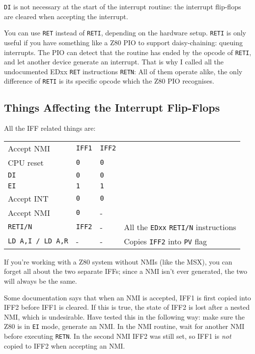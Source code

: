 {\tt DI} is not necessary at the start of the interrupt routine: the interrupt flip-flops are cleared when accepting the interrupt.

You can use {\tt RET} instead of {\tt RETI}, depending on the hardware setup. {\tt RETI} is only useful if you have something like a Z80 PIO to support daisy-chaining: queuing interrupts. The PIO can detect that the routine has ended by the opcode of {\tt RETI}, and let another device generate an interrupt. That is why I called all the undocumented EDxx {\tt RET} instructions {\tt RETN}: All of them operate alike, the only difference of {\tt RETI} is its specific opcode which the Z80 PIO recognises.


\subsection{Things Affecting the Interrupt Flip-Flops}
\label{flipflop}

All the IFF related things are:

\begin{tabular}{llll}
    Accept NMI	& {\tt IFF1}	& {\tt IFF2} \\
    CPU reset	& {\tt 0}		& {\tt 0}\\
    {\tt DI}	& {\tt 0}		& {\tt 0}\\
    {\tt EI}	& {\tt 1}		& {\tt 1}\\
    Accept INT	& {\tt 0}		& {\tt 0}\\
    Accept NMI	& {\tt 0}		& -\\
    {\tt RETI/N}& {\tt IFF2}	& - & All the {\tt EDxx} {\tt RETI/N} instructions\\
    {\tt LD A,I / LD A,R} & - & - & Copies {\tt IFF2} into {\tt PV} flag
\end{tabular}

If you're working with a Z80 system without NMIs (like the MSX), you can forget all about the two separate IFFs; since a NMI isn't ever generated, the two will always be the same. 

Some documentation says that when an NMI is accepted, IFF1 is first copied into IFF2 before IFF1 is cleared. If this is true, the state of IFF2 is lost after a nested NMI, which is undesirable. Have tested this in the following way: make sure the Z80 is in {\tt EI} mode, generate an NMI. In the NMI routine, wait for another NMI before executing {\tt RETN}. In the second NMI IFF2 was still set, so IFF1 is {\em not} copied to IFF2 when accepting an NMI.

